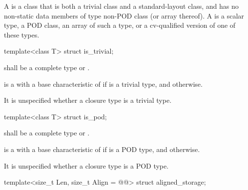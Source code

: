 \pnum
{}%
A  is a class that is both a trivial class and a
standard-layout class, and has no non-static data members of type non-POD class
(or array thereof). A  is a scalar type, a POD class, an array
of such a type, or a cv-qualified version of one of these types.

%
\begin{itemdecl}
template<class T> struct is_trivial;
\end{itemdecl}

\begin{itemdescr}
\pnum
\expects
{} shall be a complete type or \cv{} .

\pnum
\remarks
{} is a 
with a base characteristic of 
if  is a trivial type,
and  otherwise.

\pnum
\begin{note}
It is unspecified
whether a closure type is a trivial type.
\end{note}
\end{itemdescr}

%
\begin{itemdecl}
template<class T> struct is_pod;
\end{itemdecl}

\begin{itemdescr}
\pnum
\expects
{} shall be a complete type or \cv{} .

\pnum
\remarks
{} is a 
with a base characteristic of 
if  is a POD type,
and  otherwise.

\pnum
\begin{note}
It is unspecified whether a closure type is a POD type.
\end{note}
\end{itemdescr}

%
\begin{itemdecl}
template<size_t Len, size_t Align = @@>
  struct aligned_storage;
\end{itemdecl}

